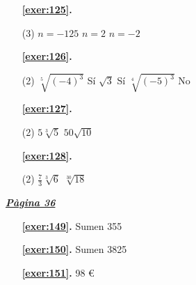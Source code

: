 \begin{enumerate}

 \item[\fontfamily{phv}\selectfont\color{blue}\textbf{\ref{exer:125}. }] \label{ans:125}
 \begin{tasks}[column-sep=1em, item-indent=1.3333em](3)
	 \task $n=-125$
	 \task $n=2$
	 \task $n=-2$
\end{tasks}



 \item[\fontfamily{phv}\selectfont\color{blue}\textbf{\ref{exer:126}. }] \label{ans:126}
 \begin{tasks}[column-sep=1em, item-indent=1.3333em](2)
	 \task* $\sqrt [{5}]{\left (-4\right )^{3}}$ Sí
	 \task $\sqrt {3}$ Sí
	 \task* $\sqrt [{4}]{\left (-5\right )^{3} }$ No
\end{tasks}



 \item[\fontfamily{phv}\selectfont\color{blue}\textbf{\ref{exer:127}. }] \label{ans:127}
 \begin{tasks}[column-sep=1em, item-indent=1.3333em](2)
	 \task $5\sqrt [3]{5}$
	 \task $50\sqrt {10}$
\end{tasks}



 \item[\fontfamily{phv}\selectfont\color{blue}\textbf{\ref{exer:128}. }] \label{ans:128}
 \begin{tasks}[column-sep=1em, item-indent=1.3333em](2)
	 \task $\frac {7}{3}\sqrt [3]{6}$
	 \task $\sqrt [30]{18}$
\end{tasks}
 \end{enumerate}

 \vspace{1cm} 
 

\vspace{0.3cm}


\hyperlink{page.36}{\textbf{\em Pàgina 36}}
\begin{enumerate}
\item[\fontfamily{phv}\selectfont\color{blue}\textbf{\ref{exer:149}. }] \label{ans:149} 
Sumen 355
 \end{enumerate}
\begin{enumerate}
\item[\fontfamily{phv}\selectfont\color{blue}\textbf{\ref{exer:150}. }] \label{ans:150} 
Sumen 3825
\item[\fontfamily{phv}\selectfont\color{blue}\textbf{\ref{exer:151}. }] \label{ans:151} 
98 \euro {}
 \end{enumerate}
\vspace{0.3cm}

